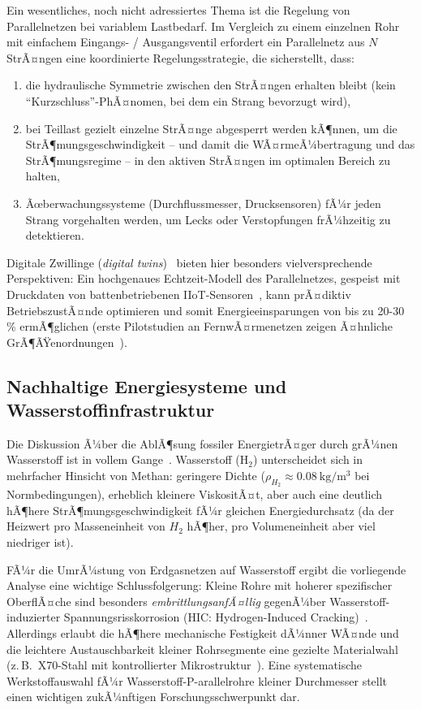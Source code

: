 ﻿\documentclass[12pt,a4paper,twoside]{article}
\theoremstyle{plain}
\theoremstyle{definition}
\theoremstyle{remark}
\begin{document}
Ein wesentliches, noch nicht adressiertes Thema ist die Regelung von
Parallelnetzen bei variablem Lastbedarf.
Im Vergleich zu einem einzelnen Rohr mit einfachem Eingangs- / Ausgangsventil
erfordert ein Parallelnetz aus $N$ StrÃ¤ngen eine koordinierte Regelungsstrategie,
die sicherstellt, dass:
\begin{enumerate}
  \item die hydraulische Symmetrie zwischen den StrÃ¤ngen erhalten bleibt
        (kein ``Kurzschluss''-PhÃ¤nomen, bei dem ein Strang bevorzugt wird),
  \item bei Teillast gezielt einzelne StrÃ¤nge abgesperrt werden kÃ¶nnen, um
        die StrÃ¶mungsgeschwindigkeit -- und damit die WÃ¤rmeÃ¼bertragung und das
        StrÃ¶mungsregime -- in den aktiven StrÃ¤ngen im optimalen Bereich zu halten,
  \item Ãœberwachungssysteme (Durchflussmesser, Drucksensoren) fÃ¼r jeden Strang
        vorgehalten werden, um Lecks oder Verstopfungen frÃ¼hzeitig zu detektieren.
\end{enumerate}

Digitale Zwillinge (\textit{digital twins})~\cite{Grieves2016} bieten hier
besonders vielversprechende Perspektiven: Ein hochgenaues Echtzeit-Modell
des Parallelnetzes, gespeist mit Druckdaten von battenbetriebenen
IIoT-Sensoren~\cite{Boyes2018}, kann prÃ¤diktiv BetriebszustÃ¤nde optimieren
und somit Energieeinsparungen von bis zu 20-30\,\% ermÃ¶glichen
(erste Pilotstudien an FernwÃ¤rmenetzen zeigen Ã¤hnliche GrÃ¶ÃŸenordnungen~\cite{Bianchi2019}).

\subsection{Nachhaltige Energiesysteme und Wasserstoffinfrastruktur}
\label{ssec:ausblick_h2}

Die Diskussion Ã¼ber die AblÃ¶sung fossiler EnergietrÃ¤ger durch grÃ¼nen Wasserstoff
ist in vollem Gange~\cite{IEA2019}.
Wasserstoff ($\mathrm{H_2}$) unterscheidet sich in mehrfacher Hinsicht von
Methan: geringere Dichte ($\rho_{H_2} \approx \SI{0.08}{\kilogram\per\metre\cubed}$
bei Normbedingungen), erheblich kleinere ViskositÃ¤t, aber auch eine deutlich
hÃ¶here StrÃ¶mungsgeschwindigkeit fÃ¼r gleichen Energiedurchsatz (da der Heizwert
pro Masseneinheit von $H_2$ hÃ¶her, pro Volumeneinheit aber viel niedriger ist).

FÃ¼r die UmrÃ¼stung von Erdgasnetzen auf Wasserstoff ergibt die vorliegende
Analyse eine wichtige Schlussfolgerung:
Kleine Rohre mit hoherer spezifischer OberflÃ¤che sind besonders
\emph{embrittlungsanfÃ¤llig} gegenÃ¼ber Wasserstoff-induzierter Spannungsrisskorrosion
(HIC: Hydrogen-Induced Cracking)~\cite{Nanninga2011}.
Allerdings erlaubt die hÃ¶here mechanische Festigkeit dÃ¼nner WÃ¤nde und die
leichtere Austauschbarkeit kleiner Rohrsegmente eine gezielte Materialwahl
(z.\,B.\ X70-Stahl mit kontrollierter Mikrostruktur~\cite{Dodds2011}).
Eine systematische Werkstoffauswahl fÃ¼r Wasserstoff-P-arallel\-rohre
kleiner Durchmesser stellt einen wichtigen zukÃ¼nftigen Forschungsschwerpunkt dar.
\end{document}

